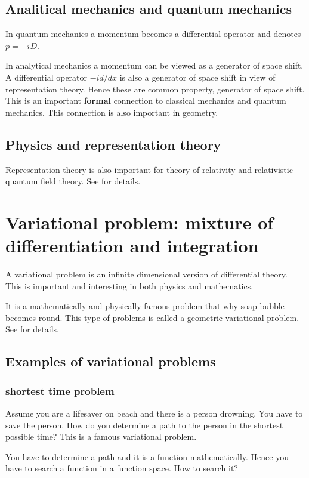 \documentclass[openany, a4paper, oneside]{jsbook}
\begin{document}
\subsection{Analitical mechanics and quantum mechanics}

In quantum mechanics a momentum becomes a differential operator
and denotes $p = -i D$.

In analytical mechanics a momentum
can be viewed as a generator of space shift.
A differential operator $- i d/dx$ is also
a generator of space shift in view of representation theory.
Hence these are common property, generator of space shift.
This is an important \textbf{formal} connection to classical mechanics and quantum mechanics.
This connection is also important in geometry.
\subsection{Physics and representation theory}

Representation theory is also important for
theory of relativity and relativistic quantum field theory.
See \cite{TakeshiHirai1, TakeshiHirai2} for details.
\section{Variational problem: mixture of differentiation and integration}

A variational problem is an infinite dimensional version of differential theory.
This is important and interesting in both physics and mathematics.

It is a mathematically and physically famous problem that why soap bubble becomes round.
This type of problems is called a geometric variational problem.
See \cite{SeikiNishikawa1} for details.
\subsection{Examples of variational problems}

\subsubsection{shortest time problem}

Assume you are a lifesaver on beach and there is a person drowning.
You have to save the person.
How do you determine a path to the person in the shortest possible time?
This is a famous variational problem.

You have to determine a path and it is a function mathematically.
Hence you have to search a function in a function space.
How to search it?
\end{document}
